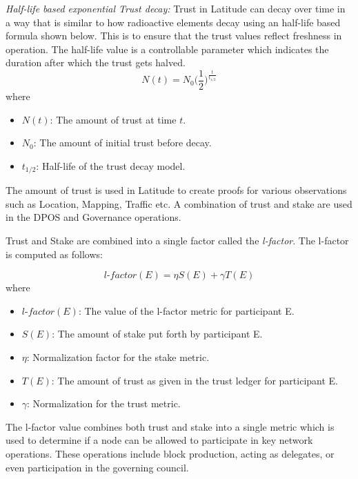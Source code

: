 \noindent
{\em Half-life based exponential Trust decay:}
Trust in Latitude can decay over time in a way that is similar to how radioactive elements decay
using an half-life based formula shown below. This is to ensure that the trust values reflect freshness in operation.
The half-life value is a controllable parameter which indicates the duration after which the trust gets halved.
\begin{equation*}
    \label{eq_trust_decay}
    N(t) = N_0 \bigg(\frac{1}{2}\bigg)^\frac{t}{t_{1/2}}
\end{equation*}
where 
\begin{itemize}
    \item $N(t)$: The amount of trust at time $t$.
    \item $N_0$: The amount of initial trust before decay.
    \item $t_{1/2}$: Half-life of the trust decay model.
\end{itemize}

The amount of trust is used in Latitude to create proofs for various observations such as Location, Mapping, Traffic
etc. A combination of trust and stake are used in the DPOS and Governance operations.

Trust and Stake are combined into a single factor called the {\em l-factor}. The l-factor is computed as follows:

\newcommand\LFACTOR{\mathit{\text{l-factor}}}
\begin{equation*}
    \label{eq_l_factor}
    \LFACTOR(E) = \eta S(E) + \gamma T(E)
\end{equation*}
where
\begin{itemize}
    \item $\LFACTOR(E)$: The value of the l-factor metric for participant E.
    \item $S(E)$: The amount of stake put forth by participant E.
    \item $\eta$: Normalization factor for the stake metric.
    \item $T(E)$: The amount of trust as given in the trust ledger for participant E.
    \item $\gamma$: Normalization for the trust metric.
\end{itemize}

The l-factor value combines both trust and stake into a single metric which is used to determine if a node can be
allowed to participate in key network operations. These operations include block production, acting as delegates, or
even participation in the governing council.

